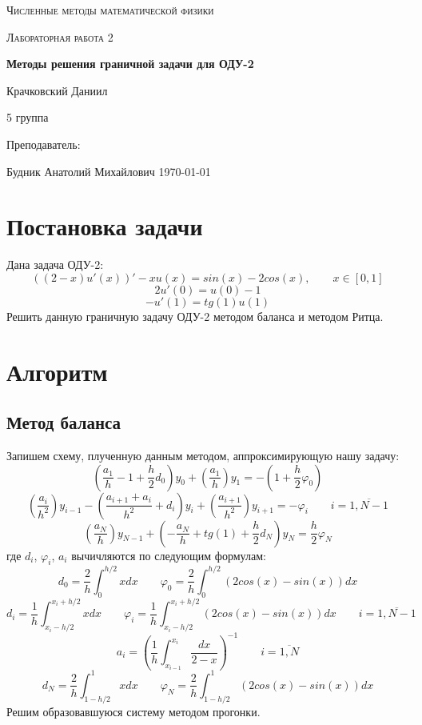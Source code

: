 \documentclass[12pt]{article}
\author{Даниил Крачковский}
\begin{document}
	\begin{titlepage}
		\centering
		{\scshape\LARGE Численные методы математической физики \par}
		\vfill
		{\scshape\Large Лабораторная работа 2 \par}
		\vspace{1cm}
		{\huge\bfseries Методы решения граничной задачи для ОДУ-2 \par}
		\vspace{2cm}
		{\Large Крачковский Даниил\par}
		5 группа \par
		\vspace{0.5cm}
		Преподаватель:\par
		Будник Анатолий Михайлович
		\vfill
		{\large \today}
	\end{titlepage}
	
	
\section*{Постановка задачи}
	Дана задача ОДУ-2:
	$$
		((2-x)u'(x))' - x u(x) = sin(x) - 2cos(x), \qquad x \in [0, 1]
	$$
	$$
		2u'(0) = u(0) - 1
	$$
	$$
		-u'(1) = tg(1) u(1)
	$$
	Решить данную граничную задачу ОДУ-2 методом баланса и методом Ритца.
\section*{Алгоритм}
	\subsection*{Метод баланса}
		Запишем схему, плученную данным методом, аппроксимирующую нашу задачу:
		$$
			\left( \dfrac{a_1}{h} - 1 + \dfrac{h}{2}d_0 \right) y_0 +
			\left( \dfrac{a_1}{h} \right) y_1 =
			- \left( 1 + \dfrac{h}{2}\varphi_0 \right)
		$$
		$$
			\left( \dfrac{a_i}{h^2} \right) y_{i-1} -
			\left( \dfrac{a_{i+1} + a_i}{h^2}  + d_i\right) y_i +
			\left( \dfrac{a_{i+1}}{h^2} \right) y_{i+1} =
			-\varphi_i
			\qquad 
			i = \overline{1, N-1}
		$$
		$$
			\left( \dfrac{a_N}{h} \right) y_{N-1} +
			\left( -\dfrac{a_N}{h} + tg(1) + \dfrac{h}{2} d_N \right) y_N =
			\dfrac{h}{2}\varphi_N
		$$
		где $d_i$, $\varphi_i$, $a_i$ вычичляются по следующим формулам:
		$$
			d_0 = \dfrac{2}{h} \int_0^{h/2} x dx
			\qquad
			\varphi_0 = \dfrac{2}{h} \int_0^{h/2} (2cos(x) - sin(x)) dx
		$$
		$$
			d_i = \dfrac{1}{h} \int_{x_i -h/2}^{x_i + h/2} x dx
			\qquad
			\varphi_i = \dfrac{1}{h} \int_{x_i -h/2}^{x_i + h/2} (2cos(x) - sin(x)) dx
			\qquad
			i = \overline{1, N- 1}
		$$
		$$ 
			a_i = \left( \dfrac{1}{h} \int_{x_{i-1}}^{x_i} \dfrac{dx}{2-x} \right)^{-1}
			\qquad
			i = \overline{1, N}
		$$
		$$
			d_N = \dfrac{2}{h} \int_{1-h/2}^1 x dx
			\qquad
			\varphi_N = \dfrac{2}{h} \int_{1-h/2}^1 (2cos(x) - sin(x)) dx
		$$
		Решим образовавшуюся систему методом прогонки.
\end{document}
